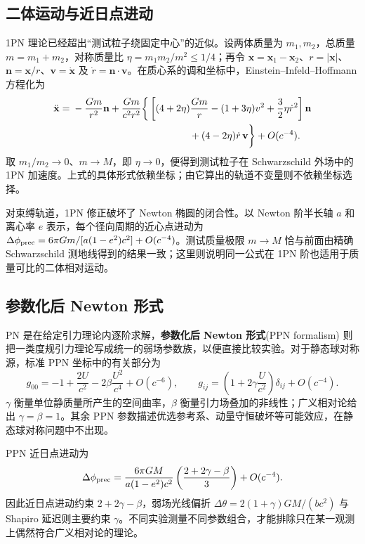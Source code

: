 \subsection{二体运动与近日点进动}

1PN 理论已经超出“测试粒子绕固定中心”的近似。设两体质量为 $m_1,m_2$，总质量 $m=m_1+m_2$，对称质量比 $\eta=m_1m_2/m^2\leqslant1/4$；再令 $\mathbf x=\mathbf x_1-\mathbf x_2$、$r=|\mathbf x|$、$\mathbf n=\mathbf x/r$、$\mathbf v=\dot{\mathbf x}$ 及 $\dot r=\mathbf n\cdot\mathbf v$。在质心系的调和坐标中，Einstein--Infeld--Hoffmann 方程化为
\[
\begin{split}
    \ddot{\mathbf x}={}&-\frac{Gm}{r^2}\mathbf n
    +\frac{Gm}{c^2r^2}\bigg\{
       \left[(4+2\eta)\frac{Gm}{r}-(1+3\eta)v^2
       +\frac{3}{2}\eta\dot r^2\right]\mathbf n \\
       &\hspace{42mm}+(4-2\eta)\dot r\,\mathbf v\bigg\}
    +O(c^{-4}).
\end{split}
\]
取 $m_1/m_2\to0$、$m\to M$，即 $\eta\to0$，便得到测试粒子在 Schwarzschild 外场中的 1PN 加速度。上式的具体形式依赖坐标；由它算出的轨道不变量则不依赖坐标选择。

对束缚轨道，1PN 修正破坏了 Newton 椭圆的闭合性。以 Newton 阶半长轴 $a$ 和离心率 $e$ 表示，每个径向周期的近心点进动为 $\Delta\phi_{\rm prec}=6\pi Gm/[a(1-e^2)c^2]+O(c^{-4})$。测试质量极限 $m\to M$ 恰与前面由精确 Schwarzschild 测地线得到的结果一致；这里则说明同一公式在 1PN 阶也适用于质量可比的二体相对运动。

\subsection{参数化后 Newton 形式}

PN 是在给定引力理论内逐阶求解，\textbf{参数化后 Newton 形式}(PPN formalism) 则把一类度规引力理论写成统一的弱场参数族，以便直接比较实验\cite{Will18,Will-thesis}。对于静态球对称源，标准 PPN 坐标中的有关部分为
\[
    g_{00}=-1+\frac{2U}{c^2}-2\beta\frac{U^2}{c^4}+O(c^{-6}),\qquad
    g_{ij}=\left(1+2\gamma\frac{U}{c^2}\right)\delta_{ij}+O(c^{-4}).
\]
$\gamma$ 衡量单位静质量所产生的空间曲率，$\beta$ 衡量引力场叠加的非线性；广义相对论给出 $\gamma=\beta=1$。其余 PPN 参数描述优选参考系、动量守恒破坏等可能效应，在静态球对称问题中不出现。

PPN 近日点进动为
\[
    \Delta\phi_{\rm prec}=\frac{6\pi GM}{a(1-e^2)c^2}
    \left(\frac{2+2\gamma-\beta}{3}\right)+O(c^{-4}).
\]
因此近日点进动约束 $2+2\gamma-\beta$，弱场光线偏折 $\Delta\theta=2(1+\gamma)GM/(bc^2)$ 与 Shapiro 延迟则主要约束 $\gamma$。不同实验测量不同参数组合，才能排除只在某一观测上偶然符合广义相对论的理论。

